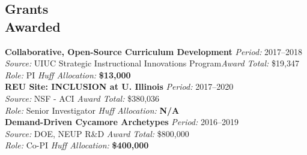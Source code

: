 \documentclass[margin,line]{resume}
\begin{document}
\begin{resume}
    \section{\mysidestyle Grants\\Awarded} 
    \textbf{Collaborative, Open-Source Curriculum Development} \hfill \textsl{Period:} 2017--2018\\
    \textsl{Source:} UIUC Strategic Instructional Innovations Program\hfill \textsl{Award Total:} \$19,347\\
    \textsl{Role:} PI \hfill \textsl{Huff Allocation:} \textbf{\$13,000}\vspace{2mm}\\%
    \textbf{REU Site: INCLUSION at U. Illinois} \hfill \textsl{Period:} 2017--2020\\
    \textsl{Source:} NSF - ACI \hfill \textsl{Award Total:} \$380,036\\
    \textsl{Role:} Senior Investigator \hfill \textsl{Huff Allocation:} \textbf{N/A}\vspace{2mm}\\%
    \textbf{Demand-Driven Cycamore Archetypes} \hfill \textsl{Period:} 2016--2019\\
    \textsl{Source:} DOE, NEUP R\&D \hfill \textsl{Award Total:} \$800,000\\
    \textsl{Role:} Co-PI \hfill \textsl{Huff Allocation:} \textbf{\$400,000}\vspace{2mm}\\%

\end{resume}
\end{document}
